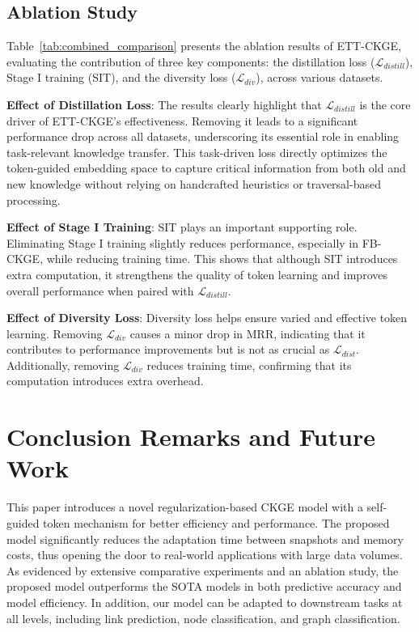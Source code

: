 \documentclass[runningheads]{llncs}
\begin{document}
\subsection{Ablation Study}


Table~\ref{tab:combined_comparison} presents the ablation results of ETT-CKGE, evaluating the contribution of three key components: the distillation loss ($\mathcal{L}_{distill}$), Stage I training (SIT), and the diversity loss ($\mathcal{L}_{div}$), across various datasets. 


\textbf{Effect of Distillation Loss}: The results clearly highlight that $\mathcal{L}_{distill}$ is the core driver of ETT-CKGE’s effectiveness. Removing it leads to a significant performance drop across all datasets, underscoring its essential role in enabling task-relevant knowledge transfer. This task-driven loss directly optimizes the token-guided embedding space to capture critical information from both old and new knowledge without relying on handcrafted heuristics or traversal-based processing.

\textbf{Effect of Stage I Training}: SIT plays an important supporting role. Eliminating Stage I training slightly reduces performance, especially in FB-CKGE, while reducing training time. This shows that although SIT introduces extra computation, it strengthens the quality of token learning and improves overall performance when paired with $\mathcal{L}_{distill}$.

\textbf{Effect of Diversity Loss}: Diversity loss helps ensure varied and effective token learning. Removing $\mathcal{L}_{div}$ causes a minor drop in MRR, indicating that it contributes to performance improvements but is not as crucial as $\mathcal{L}_{dist}$. Additionally, removing $\mathcal{L}_{div}$ reduces training time, confirming that its computation introduces extra overhead.






\section{Conclusion Remarks and Future Work}

This paper introduces a novel regularization-based CKGE model with a self-guided token mechanism for better efficiency and performance. The proposed model significantly reduces the adaptation time between snapshots and memory costs, thus opening the door to real-world applications with large data volumes. As evidenced by extensive comparative experiments and an ablation study, the proposed model outperforms the SOTA models in both predictive accuracy and model efficiency. In addition, our model can be adapted to downstream tasks at all levels, including link prediction, node classification, and graph classification. 
\end{document}
